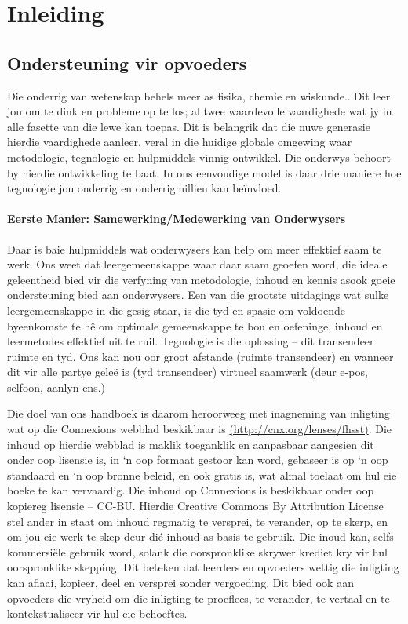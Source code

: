 \chapter{Inleiding}

\section{Ondersteuning vir opvoeders}
Die onderrig van wetenskap behels meer as fisika, chemie en wiskunde...Dit leer jou om te dink en probleme op te los; al twee waardevolle vaardighede wat jy in alle fasette van die lewe kan toepas. Dit is belangrik dat die nuwe generasie hierdie vaardighede aanleer, veral in die huidige globale omgewing waar metodologie, tegnologie en hulpmiddels vinnig ontwikkel. Die onderwys behoort by hierdie ontwikkeling te baat. In ons eenvoudige model is daar drie maniere hoe tegnologie jou onderrig en onderrigmillieu kan beïnvloed.


\subsubsection{Eerste Manier: Samewerking/Medewerking van Onderwysers}
Daar is baie hulpmiddels wat onderwysers kan help om meer effektief saam te werk. Ons weet dat leergemeenskappe waar daar saam geoefen word, die ideale geleentheid bied vir die verfyning van metodologie, inhoud en kennis asook goeie ondersteuning bied aan onderwysers. Een van die grootste uitdagings wat sulke leergemeenskappe in die gesig staar, is die tyd en spasie om voldoende byeenkomste te hê om optimale gemeenskappe te bou en oefeninge, inhoud en leermetodes effektief uit te ruil. Tegnologie is die oplossing – dit transendeer ruimte en tyd. Ons kan nou oor groot afstande (ruimte transendeer) en wanneer dit vir alle partye geleë is (tyd transendeer) virtueel saamwerk (deur e-pos, selfoon, aanlyn ens.)\par


Die doel van ons handboek is daarom heroorweeg met inagneming van inligting wat op die Connexions webblad beskikbaar is \underline{(http://cnx.org/lenses/fhsst)}. Die inhoud op hierdie webblad is maklik toeganklik en aanpasbaar aangesien dit onder oop lisensie is, in ‘n oop formaat gestoor kan word, gebaseer is op ‘n oop standaard en ‘n oop bronne beleid, en ook gratis is, wat almal toelaat om hul eie boeke te kan vervaardig. Die inhoud op Connexions is beskikbaar onder oop kopiereg lisensie – CC-BU. Hierdie Creative Commons By Attribution License stel ander in staat om inhoud regmatig te versprei, te verander, op te skerp, en om jou eie werk te skep deur dié inhoud as basis te gebruik. Die inoud kan, selfs kommersiële gebruik word, solank die oorspronklike skrywer krediet kry vir hul oorspronklike skepping. Dit beteken dat leerders en opvoeders wettig die inligting kan aflaai, kopieer, deel en versprei sonder vergoeding. Dit bied ook aan opvoeders die vryheid om die inligting te proeflees, te verander, te vertaal en te kontekstualiseer vir hul eie behoeftes.
 \par

